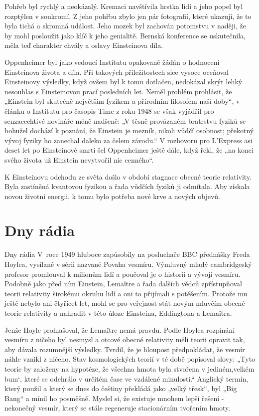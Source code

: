   Pohřeb byl rychlý a neokázalý. Kremaci navštívila hrstka lidí a jeho popel byl rozptýlen v
  soukromí. Z jeho pohřbu zbylo jen pár fotografií, které ukazují, že to byla tichá a skromná
  událost. Jeho mozek byl zachován potomstvu v naději, že by mohl posloužit jako klíč k jeho
  genialitě. Bernská konference se uskutečnila, měla teď charakter chvály a oslavy Einsteinova díla.
  
  Oppenheimer byl jako vedoucí Institutu opakovaně žádán o hodnocení Einsteinova života a díla. Při
  takových příležitostech sice vysoce oceňoval Einsteinovy výsledky, když ovšem byl k tomu dotlačen,
  nedokázal skrýt lehký nesouhlas s Einsteinovou prací posledních let. Neměl problém prohlásit, že
  „Einstein byl skutečně největším fyzikem a přírodním filosofem naší doby“, v článku o Institutu
  pro časopis Time z roku 1948 se však vyjádřil pro senzacechtivé novináře méně nadšeně: „V těsně
  provázaném bratrstvu fyziků se bohužel dochází k poznání, že Einstein je mezník, nikoli vůdčí
  osobnost; překotný vývoj fyziky ho zanechal daleko za čelem závodu.“ V rozhovoru pro L’Express asi
  deset let po Einsteinově smrti šel Oppenheimer ještě dále, když řekl, že „na konci svého života už
  Einstein nevytvořil nic cenného“. 
  
  K Einsteinovu odchodu ze světa došlo v období stagnace obecné teorie relativity. Byla zastíněná
  kvantovou fyzikou a řada vůdčích fyziků ji odmítala. Aby získala novou životní energii, k tomu
  bylo potřeba nové krve a nových objevů.

\section{Dny rádia}\label{kulIchIIIsecVII}
  Dny rádia V roce 1949 hluboce zapůsobily na posluchače BBC přednášky Freda Hoylea, vysílané v
  sérii nazvané Povaha vesmíru. Výmluvný mladý cambridgeský profesor promlouval k milionům lidí a
  poučoval je o historii a vývoji vesmíru. Podobně jako před ním Einstein, Lemaître a řada dalších
  vědců zpřístupňoval teorii relativity širokému okruhu lidí a oni to přijímali s potěšením. Protože
  mu ještě nebylo ani čtyřicet let, mohl se pro veřejnost stát novým mluvčím obecné teorie
  relativity a nahradit v této úloze Einsteina, Eddingtona a Lemaîtra. 

  Jenže Hoyle prohlašoval, že Lemaître nemá pravdu. Podle Hoylea rozpínání vesmíru z ničeho byl
  nesmysl a otcové obecné relativity měli teorii opravit tak, aby dávala rozumnější výsledky.
  Tvrdil, že je hloupost předpokládat, že vesmír náhle vznikl z ničeho. Stav kosmologických teorií v
  té době popisoval slovy: „Tyto teorie by založeny na hypotéze, že všechna hmota byla stvořena v
  jediném,velkém bum‘, které se odehrálo v určitém čase ve vzdálené minulosti.“ Anglický termín,
  který použil a který se dnes do češtiny překládá jako „velký třesk“, byl „Big Bang“ a mínil ho
  posměšně. Myslel si, že existuje mnohem lepší řešení - nekonečný vesmír, který se stále regeneruje
  stacionárním tvořením hmoty. 

